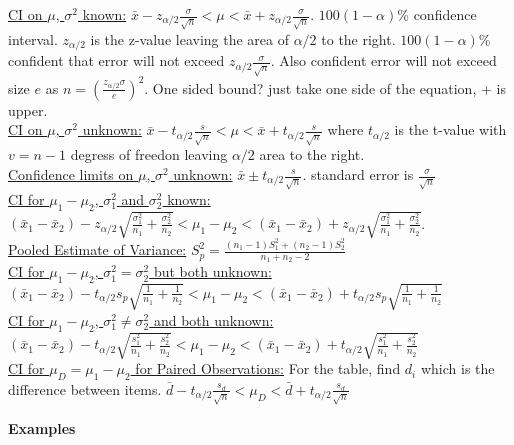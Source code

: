 \documentclass[9pt]{article}
\begin{document}
    \begin{multicols}{2}
        \noindent\uline{CI on $\mu$, $\sigma^2$ known:} $\bar{x}-z_{\alpha/2}\frac{\sigma}{\sqrt{n}} < \mu < \bar{x}+z_{\alpha/2}\frac{\sigma}{\sqrt{n}}$. $100(1-\alpha)$\% confidence interval.
        $z_{\alpha/2}$ is the z-value leaving the area of $\alpha/2$ to the right. $100(1-\alpha)$\% confident that error will not exceed $z_{\alpha/2}\frac{\sigma}{\sqrt{n}}$. Also confident error
        will not exceed size $e$ as $n=(\frac{z_{\alpha/2}\sigma}{e})^2$. One sided bound? just take one side of the equation, + is upper.\\
        \uline{CI on $\mu$, $\sigma^2$ unknown:} $\bar{x}-t_{\alpha/2}\frac{s}{\sqrt{n}} < \mu < \bar{x}+t_{\alpha/2}\frac{s}{\sqrt{n}}$ where $t_{\alpha/2}$ is the t-value with $v=n-1$ degress of freedon
        leaving $\alpha/2$ area to the right.\\
        \uline{Confidence limits on $\mu$, $\sigma^2$ unknown:} $\bar{x}\pm t_{\alpha/2}\frac{s}{\sqrt{n}}$. standard error is $\frac{\sigma}{\sqrt{n}}$\\
        \uline{CI for $\mu_1-\mu_2$, $\sigma_1^2$ and $\sigma_2^2$ known:} $(\bar{x}_1-\bar{x}_2)-z_{\alpha/2}\sqrt{\frac{\sigma_1^2}{n_1}+\frac{\sigma_2^2}{n_2}} < \mu_1-\mu_2 < (\bar{x}_1-\bar{x}_2)+z_{\alpha/2}\sqrt{\frac{\sigma_1^2}{n_1}+\frac{\sigma_2^2}{n_2}}$.\\
        \uline{Pooled Estimate of Variance:} $S_p^2=\frac{(n_1-1)S_1^2+(n_2-1)S^2_2}{n_1+n_2-2}$\\
        \uline{CI for $\mu_1-\mu_2$, $\sigma_1^2=\sigma_2^2$ but both unknown:} \\$(\bar{x}_1-\bar{x}_2)-t_{\alpha/2}s_p\sqrt{\frac{1}{n_1}+\frac{1}{n_2}} < \mu_1-\mu_2 < (\bar{x}_1-\bar{x}_2)+t_{\alpha/2}s_p\sqrt{\frac{1}{n_1}+\frac{1}{n_2}}$\\
        \uline{CI for $\mu_1-\mu_2$, $\sigma_1^2\not=\sigma_2^2$ and both unknown:} \\$(\bar{x}_1-\bar{x}_2)-t_{\alpha/2}\sqrt{\frac{s_1^2}{n_1}+\frac{s_2^2}{n_2}} < \mu_1-\mu_2 < (\bar{x}_1-\bar{x}_2)+t_{\alpha/2}\sqrt{\frac{s_1^2}{n_1}+\frac{s_2^2}{n_2}}$\\
        \uline{CI for $\mu_D=\mu_1-\mu_2$ for Paired Observations:} For the table, find $d_i$ which is the difference between items. $\bar{d}-t_{\alpha/2}\frac{s_d}{\sqrt{n}} < \mu_D < \bar{d}+t_{\alpha/2}\frac{s_d}{\sqrt{n}}$
    \end{multicols}
    \noindent\textbf{Examples}\\
\end{document}
